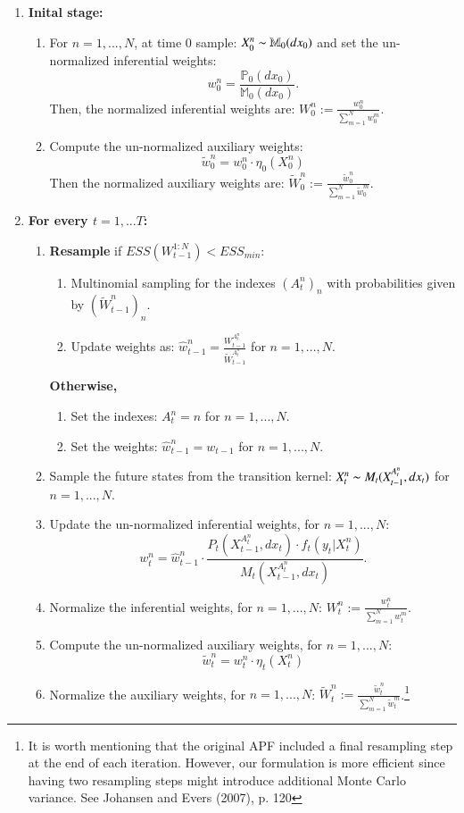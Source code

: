 \documentclass[
]{book}
\theoremstyle{break}
\theoremstyle{nonumberplain}
\begin{document}
\begin{enumerate}
    \item \textbf{Inital stage: }
    \begin{enumerate}
        \item For $n=1,...,N$, at time 0 sample: $X_0^n\thicksim\mathbb M_0(dx_0)$ and set the un-normalized inferential weights: 
    $$w_0^n=\frac{\mathbb P_0(dx_0)}{\mathbb M_0(dx_0)}.$$
    Then, the normalized inferential weights are: $W_0^n:=\frac{w_0^n}{\sum_{m=1}^Nw_0^m}$.
    \item Compute the un-normalized auxiliary weights:
        $$\tilde w_0^n=w_0^n \cdot \eta_0(X_0^n)$$
        Then the normalized auxiliary weights are:
        $\tilde W_0^n:=\frac{\tilde w_0^n}{\sum_{m=1}^N\tilde w_0^m}$.
    \end{enumerate}
    \item \textbf{For every $t=1,...T$:}
    \begin{enumerate}
        \item \textbf{Resample} if $ESS( W_{t-1}^{1:N})<ESS_{min}$:
\begin{enumerate}
    \item Multinomial sampling for the indexes $(A_t^n)_n$ with probabilities given by $(\tilde W_{t-1}^n)_n$.
    \item Update weights as: $\hat w_{t-1}^n = \frac{W_{t-1}^{A_t^n}}{\tilde W_{t-1}^{A_t^n}} $ for $n=1,...,N$.
\end{enumerate}
\textbf{Otherwise, } 
\begin{enumerate}
    \item Set the indexes: $A_t^{n}=n$ for  $n=1,...,N$.
    \item Set the weights: $\hat w_{t-1}^n = w_{t-1}$ for $n=1,...,N$.
\end{enumerate}
\item Sample the future states from the transition kernel: $X_t^n\thicksim M_t(X_{t-1}^{A_t^n},dx_t)$ for $n=1,...,N$.
\item Update the un-normalized inferential weights, for $n=1,...,N$:
\begin{equation*}
    w_t^n=\hat w_{t-1}^n\cdot \frac{P_t(X_{t-1}^{A_t^n},dx_t)\cdot f_t(y_t|X_t^n)}{ M_t(X_{t-1}^{A_t^n},dx_t)}.
\end{equation*}
\item Normalize the inferential weights, for $n=1,...,N$:  $W_t^n:=\frac{w_t^n}{\sum_{m=1}^Nw_t^m}$.
\item Compute the un-normalized auxiliary weights, for $n=1,...,N$:
\begin{equation*}
 \tilde w_t^n=w_t^n \cdot \eta_t(X_t^n)
\end{equation*}
\item Normalize the auxiliary weights, for $n=1,...,N$:  $\tilde W_t^n:=\frac{\tilde w_t^n}{\sum_{m=1}^N\tilde w_t^m}$.\footnote{It is worth mentioning that the original APF included a final resampling step at the end of each iteration. However, our formulation is more efficient since having two resampling steps might introduce additional Monte Carlo variance. See Johansen and Evers (2007), p. 120}
    \end{enumerate}
\end{enumerate}
\end{document}
